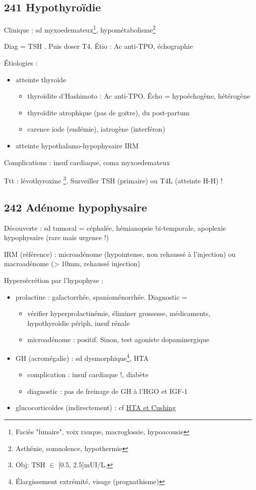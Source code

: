 \documentclass[11pt]{article}
\begin{document}
\subsection{241 Hypothyroïdie}
\label{sec:org2125b9e}
Clinique : sd myxoedemateux\footnote{Faciès "lunaire", voix rauque, macroglossie, hypoacousie}, hypométabolisme\footnote{Asthénie, somnolence, hypothermie}

Diag = TSH \inc. Puis doser T4. Étio : Ac anti-TPO, échographie

Étiologies :
\begin{itemize}
\item atteinte thyroïde
\begin{itemize}
\item thyroïdite d'Hashimoto : Ac anti-TPO. Écho = hypoéchogène, hétérogène
\item thyroïdite atrophique (pas de goitre), du post-partum
\item carence iode (endémie), iatrogène (interféron)
\end{itemize}
\item atteinte hypothalamo-hypophysaire \thus IRM
\end{itemize}

Complications : insuf cardiaque, coma myxoedemateux  

Ttt : lévothyroxine \footnote{Obj: TSH \(\in\) [0.5, 2.5]mUI/L.}. Surveiller TSH (primaire) ou T4L (atteinte H-H) !

\subsection{242 Adénome hypophysaire}
\label{sec:org673e880}
Découverte : sd tumoral = céphalée, hémianopsie bi-temporale, apoplexie
hypophysaire (rare mais urgence !)

IRM (référence) : microadénome (hypointense, non rehaussé à l'injection) ou
macroadénome (> 10mm, rehaussé injection)

Hypersécrétion par l'hypophyse :
\begin{itemize}
\item prolactine : galactorrhée, spanioménorrhée. Diagnostic = 
\begin{itemize}
\item vérifier hyperprolactinémie, éliminer grossesse,  médicaments, hypothyroïdie
périph, insuf rénale
\item microadénome : positif. Sinon, test agoniste dopaminergique
\end{itemize}
\item GH (acromégalie) : sd dysmorphique\footnote{Élargissement extrémité, visage (prognathisme)}, HTA
\begin{itemize}
\item complication : insuf cardiaque !, diabète
\item diagnostic : pas de freinage de GH à l'HGO et \inc{} IGF-1
\end{itemize}
\item glucocorticoïdes (indirectement) : cf \hyperref[org4c5b3d3]{HTA et Cushing}
\end{itemize}
\end{document}

